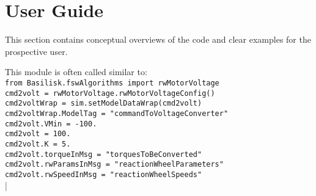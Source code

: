 \section{User Guide}
This section contains conceptual overviews of the code and clear examples for the prospective user. 

This module is often called similar to:\\
\verb|from Basilisk.fswAlgorithms import rwMotorVoltage|\\
\verb|cmd2volt = rwMotorVoltage.rwMotorVoltageConfig()|\\
\verb|cmd2voltWrap = sim.setModelDataWrap(cmd2volt)|\\
\verb|cmd2voltWrap.ModelTag = "commandToVoltageConverter"|\\
\verb|cmd2volt.VMin = -100.|\\
\verb|cmd2volt = 100.|\\
\verb|cmd2volt.K = 5.|\\
\verb|cmd2volt.torqueInMsg = "torquesToBeConverted"|\\
\verb|cmd2volt.rwParamsInMsg = "reactionWheelParameters"|\\
\verb|cmd2volt.rwSpeedInMsg = "reactionWheelSpeeds"|\\


|
